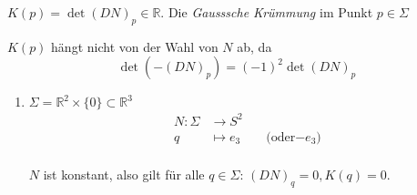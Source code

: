 \documentclass[../main.tex]{subfiles}
\begin{document}
\begin{definition}$K(p) = \det{(DN)_{p}}\in \mathbb{R}$. Die \emph{Gausssche Krümmung} im Punkt $p \in \Sigma$
\end{definition}

\begin{remark}
    $K(p)$ hängt nicht von der Wahl von $N$ ab, da $$\det(-(DN)_{p}) = (-1)^{2} \det(DN)_{p}$$
\end{remark}
\begin{examples}
    \leavevmode
    \begin{enumerate}
        \item 
        \begin{minipage}[t]{0.6\columnwidth}
            $\Sigma = \mathbb{R}^{2} \times \{0\} \subset \mathbb{R}^{3}$
            \begin{align*}
                N : \Sigma & \to S^{2}\\
                q & \mapsto e_{3} \qquad \text{(oder$-e_{3}$)}\\
            \end{align*}
        \end{minipage}
        \begin{minipage}[t]{0.2\columnwidth}
            \begin{figure}[H]
                \centering
                \def\svgwidth{\textwidth}
                
            \end{figure}
        \end{minipage}

        $N$ ist konstant, also gilt für alle $q \in \Sigma$: $(DN)_{q} = 0, K(q) = 0$.



\end{enumerate}
\end{examples}
\end{document}
